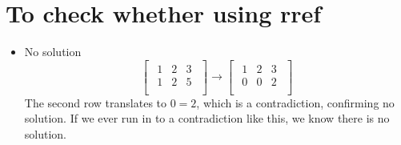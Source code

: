 \documentclass{article}
\begin{document}
\section{To check whether using rref}
\begin{itemize}
    \item No solution
    \[
    \begin{bmatrix}
        \begin{array}{cc|c}
            1 & 2 &  3 \\
            1 & 2 &  5 \\
        \end{array}
    \end{bmatrix}
    \xrightarrow{}
    \begin{bmatrix}
        \begin{array}{cc|c}
            1 & 2 &  3 \\
            0 & 0 &  2 \\
        \end{array}
    \end{bmatrix}
    \]
    The second row translates to $0 = 2$, which is a contradiction, confirming no solution.
    If we ever run in to a contradiction like this, we know there is no solution.


\end{itemize}
\end{document}
